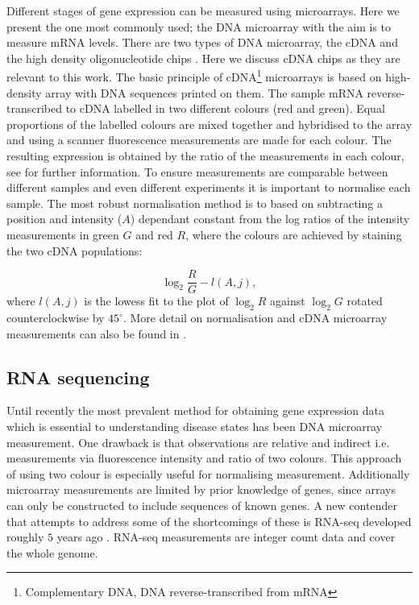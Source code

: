 Different stages of gene expression can be measured using microarrays. Here we present the one most commonly used; the DNA microarray with the aim is to measure mRNA levels. There are two types of DNA microarray, the cDNA \citep{Hughes:2001ho} and the high density oligonucleotide chips \citep{Lockhart:1996jw}. Here we discuss cDNA chips as they are relevant to this work. The basic principle of cDNA\footnote{Complementary DNA, DNA reverse-transcribed from mRNA} microarrays is based on high-density array with DNA sequences printed on them. The sample mRNA reverse-transcribed to cDNA labelled in two different colours (red and green). Equal proportions of the labelled colours are mixed together and hybridised to the array and using a scanner fluorescence measurements are made for each colour. The resulting expression is obtained by the ratio of the measurements in each colour, see \cite{phimister1999chipping} for further information. To ensure measurements are comparable between different samples and even different experiments it is important to normalise each sample. The most robust normalisation method is to based on subtracting a position and intensity ($A$) dependant constant from the log ratios of the intensity measurements in green $G$ and red $R$, where the colours are achieved by staining the two cDNA populations:

\begin{equation}
  \label{eq:microarray-norm}
  \log_2 \frac{R}{G} - l(A, j),
\end{equation}
where $l(A, j)$ is the lowess fit \citep{Cleveland:2012fu} to the plot of $\log_2 R$ against $\log_2 G$ rotated counterclockwise by $45^{\circ}$. More detail on normalisation and cDNA microarray measurements can also be found in \cite{Dudoit:2002va}.

\subsection{RNA sequencing}
\label{sec:rna-sequencing}

Until recently the most prevalent method for obtaining gene expression data which is essential to understanding disease states has been DNA microarray measurement. One drawback is that observations are relative and indirect i.e. measurements via fluorescence intensity and ratio of two colours. This approach of using two colour is especially useful for normalising measurement. Additionally microarray measurements are limited by prior knowledge of genes, since arrays can only be constructed to include sequences of known genes. A new contender that attempts to address some of the shortcomings of these is RNA-seq developed roughly $5$ years ago \citep{Mortazavi:2008jj, Nagalakshmi:2008cj}. RNA-seq measurements are integer count data and cover the whole genome.

